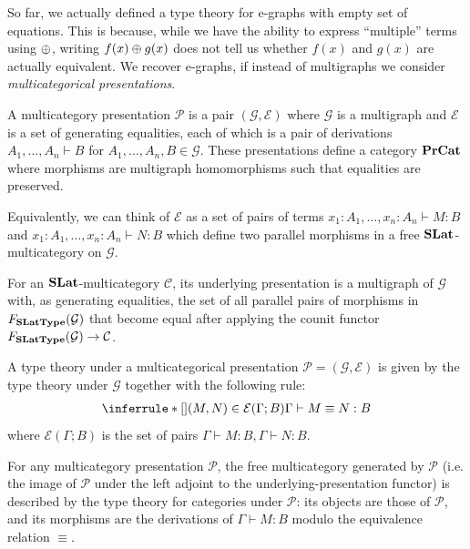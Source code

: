 So far, we actually defined a type theory for e-graphs with empty set of equations.
This is because, while we have the ability to express \enquote{multiple} terms using $\mathbin{\oplus}$, writing $f(x) \mathbin{\oplus} g(x)$ does not tell us whether $f(x)$ and $g(x)$ are actually equivalent.
We recover e-graphs, if instead of multigraphs we consider \emph{multicategorical presentations}.

\begin{definition}
  A multicategory presentation $\mathcal{P}$ is a pair $(\mathcal{G}, \mathcal{E})$ where $\mathcal{G}$ is a multigraph and $\mathcal{E}$ is a set of generating equalities, each of which is a pair of derivations $A_1, \ldots, A_n \vdash B$ for $A_1, \ldots, A_n,B \in \mathcal{G}$.
  These presentations define a category $\mathbf{PrCat}$ where morphisms are multigraph homomorphisms such that equalities are preserved.
\end{definition}
Equivalently, we can think of $\mathcal{E}$ as a set of pairs of terms $x_1 : A_1, \ldots, x_n : A_n \vdash M : B$ and $x_1 : A_1, \ldots, x_n : A_n \vdash N : B$ which define two parallel morphisms in a free $\mathbf{SLat}$-multicategory on $\mathcal{G}$.

\begin{definition}
For an $\mathbf{SLat}$-multicategory $\mathcal{C}$, its underlying presentation is a multigraph of $\mathcal{G}$ with, as generating equalities, the set of all parallel pairs of morphisms in $F_{\mathbf{SLatType}}(\mathcal{G})$ that become equal after applying the counit functor $F_{\mathbf{SLatType}}(\mathcal{G}) \to \mathcal{C}$.
\end{definition}

\begin{definition}

  A type theory under a multicategorical presentation $\mathcal{P} = (\mathcal{G}, \mathcal{E})$ is given by the type theory under $\mathcal{G}$ together with the following rule:
  \begin{align*}
    \inferrule*[]{(M,N) \in \mathcal{E}(\Gamma; B)}{\Gamma \vdash M \equiv N : B}
  \end{align*}
  where $\mathcal{E}(\Gamma; B)$ is the set of pairs $\Gamma \vdash M : B, \Gamma \vdash N : B$.
\end{definition}

\begin{proposition}
  For any multicategory presentation $\mathcal{P}$, the free multicategory generated by $\mathcal{P}$ (i.e. the image of $\mathcal{P}$ under the left adjoint to the underlying-presentation functor) is described by the type theory for categories under $\mathcal{P}$: its objects are those of $\mathcal{P}$, and its morphisms are the derivations of $\Gamma \vdash M : B$ modulo the equivalence relation $\equiv$.
\end{proposition}

